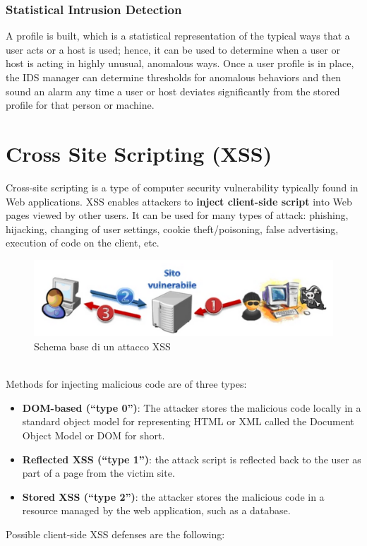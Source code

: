 \subsubsection{Statistical Intrusion Detection}
A profile is built, which is a statistical representation of the typical ways that a user acts or a host is used; hence, it can be used to determine when a user or host is acting in highly unusual, anomalous ways.
Once a user profile is in place, the IDS manager can determine thresholds for anomalous behaviors and then sound an alarm any time a user or host deviates significantly from the stored profile for that person or machine.

\section{Cross Site Scripting (XSS)}
Cross-site scripting is a type of computer security vulnerability typically found in Web applications. XSS enables attackers to \textbf{inject client-side script} into Web pages viewed by other users. It can be used for many types of attack: phishing, hijacking, changing of user settings, cookie theft/poisoning, false advertising, execution of code on the client, etc. 
\begin{figure}[htbp]
	\centering
	\includegraphics[width=0.5\linewidth]{Immagini/firewalls/XSS.png}
	\caption{Schema base di un attacco XSS} 	
	\label{fig:XSS_attack}
\end{figure}
\\
Methods for injecting malicious code are of three types:
\begin{itemize}
	\item \textbf{DOM-based (“type 0”)}: The attacker stores the malicious code locally in a standard object model for representing HTML or XML called the Document Object Model or DOM for short.
	\item \textbf{Reflected XSS (“type 1”)}: the attack script is reflected back to the user as part of a page from the victim site.
	\item \textbf{Stored XSS (“type 2”)}: the attacker stores the malicious code in a resource managed by the web application, such as a database.
\end{itemize}
Possible client-side XSS defenses are the following:
